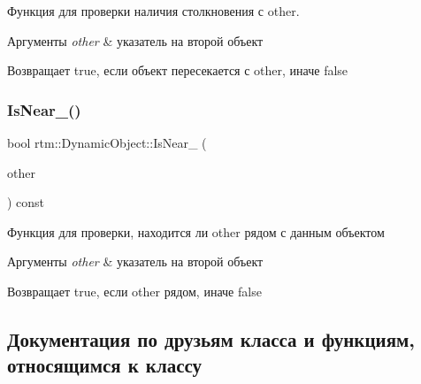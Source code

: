 Функция для проверки наличия столкновения с other. 


\begin{DoxyParams}{Аргументы}
{\em other} & указатель на второй объект \\
\hline
\end{DoxyParams}
\begin{DoxyReturn}{Возвращает}
true, если объект пересекается с other, иначе false 
\end{DoxyReturn}
\mbox{\label{classrtm_1_1_dynamic_object_a3df4074c83b3ab30d3080b4e99e08a5b}} 
\subsubsection{\texorpdfstring{Is\+Near\+\_\+()}{IsNear\_()}}
{\footnotesize\ttfamily bool rtm\+::\+Dynamic\+Object\+::\+Is\+Near\+\_\+ (\begin{DoxyParamCaption}\item[{\hyperlink{classrtm_1_1_world_object}{World\+Object} const $\ast$const}]{other }\end{DoxyParamCaption}) const\hspace{0.3cm}{\ttfamily [private]}}



Функция для проверки, находится ли other рядом с данным объектом 


\begin{DoxyParams}{Аргументы}
{\em other} & указатель на второй объект \\
\hline
\end{DoxyParams}
\begin{DoxyReturn}{Возвращает}
true, если other рядом, иначе false 
\end{DoxyReturn}


\subsection{Документация по друзьям класса и функциям, относящимся к классу}
\mbox{\label{classrtm_1_1_dynamic_object_af73a5c4922e4f77fba3e44898bfa308b}} 
